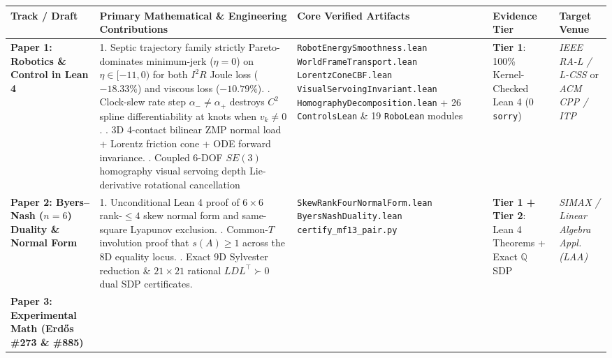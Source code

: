 \documentclass[10pt]{article}
\begin{document}
\begin{table}[h!]
\centering
\small
\renewcommand{\arraystretch}{1.18}
\begin{tabular}{@{}p{2.3cm}p{4.3cm}p{3.9cm}p{2.5cm}p{2.4cm}@{}}
\toprule
\textbf{Track / Draft} & \textbf{Primary Mathematical \& Engineering Contributions} & \textbf{Core Verified Artifacts} & \textbf{Evidence Tier} & \textbf{Target Venue} \\
\midrule
\textbf{Paper 1: Robotics \& Control in Lean 4} &
1. Septic trajectory family strictly Pareto-dominates minimum-jerk ($\eta=0$) on $\eta \in [-11, 0)$ for both $I^2R$ Joule loss ($-18.33\%$) and viscous loss ($-10.79\%$). \newline
2. Clock-slew rate step $\alpha_- \neq \alpha_+$ destroys $C^2$ spline differentiability at knots when $v_k \neq 0$. \newline
3. 3D 4-contact bilinear ZMP normal load + Lorentz friction cone + ODE forward invariance. \newline
4. Coupled 6-DOF $SE(3)$ homography visual servoing depth Lie-derivative rotational cancellation &
\texttt{RobotEnergySmoothness.lean} \newline
\texttt{WorldFrameTransport.lean} \newline
\texttt{LorentzConeCBF.lean} \newline
\texttt{VisualServoingInvariant.lean} \newline
\texttt{HomographyDecomposition.lean} \newline
+ 26 \texttt{ControlsLean} \& 19 \texttt{RoboLean} modules &
\textbf{Tier 1}: 100\% Kernel-Checked Lean 4 (0 \texttt{sorry}) &
\emph{IEEE RA-L / L-CSS} or \emph{ACM CPP / ITP} \\
\addlinespace
\textbf{Paper 2: Byers--Nash ($n=6$) Duality \& Normal Form} &
1. Unconditional Lean 4 proof of $6\times 6$ rank-$\le 4$ skew normal form and same-square Lyapunov exclusion. \newline
2. Common-$T$ involution proof that $s(A) \ge 1$ across the 8D equality locus. \newline
3. Exact 9D Sylvester reduction \& $21\times 21$ rational $LDL^\top \succ 0$ dual SDP certificates. &
\texttt{SkewRankFourNormalForm.lean} \newline
\texttt{ByersNashDuality.lean} \newline
\texttt{certify\_mf13\_pair.py} &
\textbf{Tier 1 + Tier 2}: Lean 4 Theorems + Exact $\mathbb{Q}$ SDP &
\emph{SIMAX / Linear Algebra Appl. (LAA)} \\
\addlinespace
\textbf{Paper 3: Experimental Math (Erd\H{o}s \#273 \& \#885)} &

\end{tabular}
\end{table}
\end{document}
